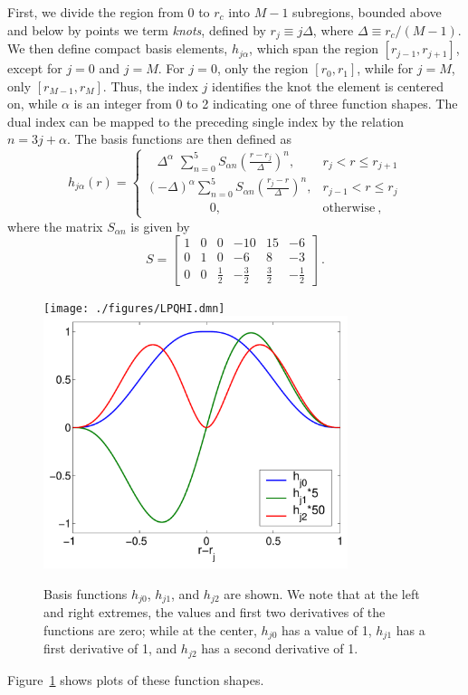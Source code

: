 First, we divide the region from 0 to $r_c$ into $M-1$ subregions,
bounded above and below by points we term {\em knots}, defined by $r_j
\equiv j\Delta$, where $\Delta \equiv r_c/(M-1)$.  We then define
compact basis elements, $h_{j\alpha}$, which span the region
$[r_{j-1},r_{j+1}]$, except for $j=0$ and $j=M$.  For $j=0$, only the
region $[r_0,r_1]$, while for $j=M$, only $[r_{M-1}, r_M]$.  Thus, the
index $j$ identifies the knot the element is centered on, while $\alpha$
is an integer from 0 to 2 indicating one of three function shapes.
The dual index can be mapped to the preceding single index by the
relation $n = 3j + \alpha$.  The basis functions are then defined as
\begin{equation}
h_{j\alpha}(r) = 
\begin{cases}
\ \ \ \, \Delta^\alpha \, \, \sum_{n=0}^5 S_{\alpha n} 
\left( \frac{r-r_j}{\Delta}\right)^n,    & r_j < r \le r_{j+1} \\
(-\Delta)^\alpha \sum_{n=0}^5 S_{\alpha n} 
\left( \frac{r_j-r}{\Delta}\right)^n,    & r_{j-1} < r \le r_j \\
\quad\quad\quad\quad\quad 0, & \text{otherwise}\:,
\end{cases}
\end{equation}
where the matrix $S_{\alpha n}$ is given by
\begin{equation}
S = 
\left[\begin{matrix}
1 & 0 & 0 & -10 & 15 & -6 \\
0 & 1 & 0 & -6  &  8 & -3 \\
0 & 0 & \frac{1}{2} & -\frac{3}{2} & \frac{3}{2} & -\frac{1}{2}
\end{matrix}\right]\:.
\end{equation}
\begin{figure}
\begin{center}
  \ifdefined\HCode
  \texttt{[image: ./figures/LPQHI.dmn]}
  \else
  \includegraphics[width=3.5in]{./figures/LPQHI.pdf}
  \fi
\caption{Basis functions $h_{j0}$, $h_{j1}$, and $h_{j2}$ are shown.
We note that at the left and right extremes, the values and first two
derivatives of the functions are zero; while at the center, $h_{j0}$
has a value of 1, $h_{j1}$ has a first derivative of 1, and $h_{j2}$
has a second derivative of 1. }
\label{fig:LPQHI} 
\end{center}
\end{figure}
Figure~\ref{fig:LPQHI} shows plots of these function shapes.

